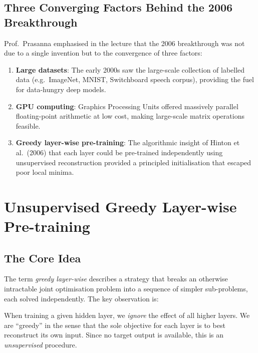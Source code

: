 \documentclass[12pt,a4paper]{article}
\begin{document}
\subsection{Three Converging Factors Behind the 2006 Breakthrough}

Prof.\ Prasanna emphasised in the lecture that the 2006 breakthrough was not
due to a single invention but to the convergence of three factors:

\begin{enumerate}[leftmargin=*, label=(\roman*)]
  \item \textbf{Large datasets}: The early 2000s saw the large-scale
        collection of labelled data (e.g.\ ImageNet, MNIST, Switchboard
        speech corpus), providing the fuel for data-hungry deep models.
  \item \textbf{GPU computing}: Graphics Processing Units offered
        massively parallel floating-point arithmetic at low cost, making
        large-scale matrix operations feasible.
  \item \textbf{Greedy layer-wise pre-training}: The algorithmic insight
        of Hinton et al.\ (2006) that each layer could be pre-trained
        independently using unsupervised reconstruction provided a principled
        initialisation that escaped poor local minima.
\end{enumerate}

\newpage

\section{Unsupervised Greedy Layer-wise Pre-training}
\label{sec:unsup}

\subsection{The Core Idea}

The term \emph{greedy layer-wise} describes a strategy that breaks an
otherwise intractable joint optimisation problem into a sequence of simpler
sub-problems, each solved independently.  The key observation is:

\begin{keyinsight}[title=Greediness in Pre-training]
  When training a given hidden layer, we \emph{ignore} the effect of all
  higher layers.  We are ``greedy'' in the sense that the sole objective
  for each layer is to best reconstruct its own input.  Since no target
  output is available, this is an \emph{unsupervised} procedure.
\end{keyinsight}
\end{document}
